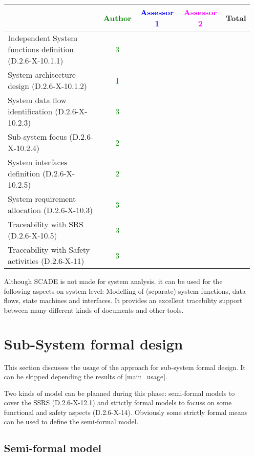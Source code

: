 \begin{tabular}{|l | c | c | c | c|}
\hline
& \textcolor{green}{Author} & \textcolor{blue}{Assessor 1} & \textcolor{magenta}{Assessor 2} & Total \\
\hline
Independent System functions definition (D.2.6-X-10.1.1)  &  \textcolor{green}{3}& & &  \\
\hline 
System architecture design (D.2.6-X-10.1.2) & \textcolor{green}{1} & & &  \\
\hline
System data flow identification (D.2.6-X-10.2.3)  &  \textcolor{green}{3}& & &  \\
\hline
Sub-system focus (D.2.6-X-10.2.4)  &  \textcolor{green}{2}& & &  \\
\hline
System interfaces definition (D.2.6-X-10.2.5)  &  \textcolor{green}{2}& & &  \\
\hline
System requirement allocation (D.2.6-X-10.3)  &  \textcolor{green}{3}& & &  \\
\hline
Traceability with SRS (D.2.6-X-10.5)  &  \textcolor{green}{3}& & &  \\
\hline
Traceability with Safety activities (D.2.6-X-11)  & \textcolor{green}{3} & & &  \\
\hline
\end{tabular}

\begin{author_comment}
Although SCADE is not made for system analysis, it can be used for the following aspects on system level: Modelling of (separate) system functions, data flows, state machines and interfaces. It provides an excellent tracebility support between many different kinds of documents and other tools.  
\end{author_comment}


\section{Sub-System formal design}
This section discusses the usage of the approach for sub-system formal design.
It can be skipped depending the results of \ref{main_usage}.

Two kinds of model can be planned during this phase: semi-formal models to  cover the SSRS (D.2.6-X-12.1) and strictly formal  models to  focuss on some functional and safety aspects (D.2.6-X-14).  Obviously some strictly  formal means can be used to define the semi-formal  model.

\subsection{Semi-formal model}

